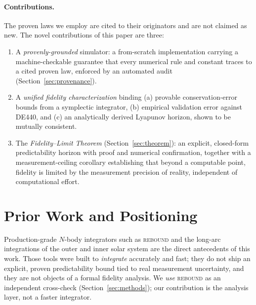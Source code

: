 \documentclass[11pt]{article}
\theoremstyle{definition}
\begin{document}
\paragraph{Contributions.}
The proven laws we employ are cited to their originators and are not claimed as
new. The novel contributions of this paper are three:
\begin{enumerate}
  \item A \emph{provenly-grounded} simulator: a from-scratch implementation
  carrying a machine-checkable guarantee that every numerical rule and constant
  traces to a cited proven law, enforced by an automated audit
  (Section~\ref{sec:provenance}).
  \item A \emph{unified fidelity characterization} binding (a) provable
  conservation-error bounds from a symplectic integrator, (b) empirical
  validation error against DE440, and (c) an analytically derived Lyapunov
  horizon, shown to be mutually consistent.
  \item The \emph{Fidelity--Limit Theorem} (Section~\ref{sec:theorem}): an
  explicit, closed-form predictability horizon with proof and numerical
  confirmation, together with a measurement-ceiling corollary establishing that
  beyond a computable point, fidelity is limited by the measurement precision
  of reality, independent of computational effort.
\end{enumerate}

\section{Prior Work and Positioning}

Production-grade $N$-body integrators such as \textsc{rebound} \cite{rebound}
and the long-arc integrations of the outer and inner solar system
\cite{laskar1989, sussmanwisdom1992, laskar2009} are the direct antecedents of
this work. Those tools were built to \emph{integrate} accurately and fast; they
do not ship an explicit, proven predictability bound tied to real measurement
uncertainty, and they are not objects of a formal fidelity analysis. We
\emph{use} \textsc{rebound} as an independent cross-check
(Section~\ref{sec:methods}); our contribution is the analysis layer, not a
faster integrator.
\end{document}

